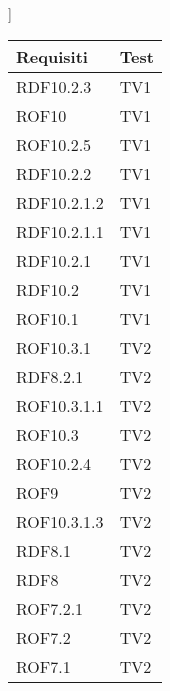 ]

\begin{center}
\begin{longtable}{|p{7cm}|p{7cm}|}
\toprule
\textbf{Requisiti} & \textbf{Test}\\

\midrule
RDF10.2.3
& TV1\\

\midrule
ROF10
& TV1\\

\midrule
ROF10.2.5
& TV1\\

\midrule
RDF10.2.2
& TV1\\

\midrule
RDF10.2.1.2
& TV1\\

\midrule
RDF10.2.1.1
& TV1\\

\midrule
RDF10.2.1
& TV1\\

\midrule
RDF10.2
& TV1\\

\midrule
ROF10.1
& TV1\\

\midrule
ROF10.3.1
& TV2\\

\midrule
RDF8.2.1
& TV2\\

\midrule
ROF10.3.1.1
& TV2\\

\midrule
ROF10.3
& TV2\\

\midrule
ROF10.2.4
& TV2\\

\midrule
ROF9
& TV2\\

\midrule
ROF10.3.1.3
& TV2\\

\midrule
RDF8.1
& TV2\\

\midrule
RDF8
& TV2\\

\midrule
ROF7.2.1
& TV2\\

\midrule
ROF7.2
& TV2\\

\midrule
ROF7.1
& TV2\\


\end{longtable}
\end{center}
